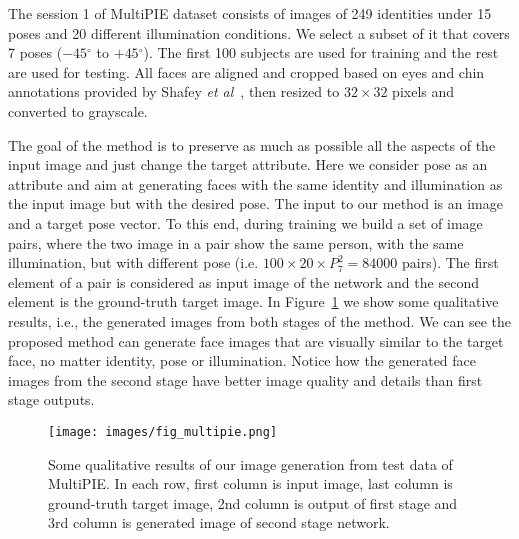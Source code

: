 \documentclass[10pt,twocolumn,letterpaper]{article}
\newcommand{\degree}{\ensuremath{{}^{\circ}}\xspace}
\def\etal{\emph{et al}\onedot}
\begin{document}
The session 1 of MultiPIE dataset consists of images of 249 identities under 15 poses and 20 different illumination conditions. We select a subset of it that covers 7 poses ($-45\degree$ to $+45\degree$). The first 100 subjects are used for training and the rest are used for testing. 
All faces are aligned and cropped based on eyes and chin annotations provided by Shafey \etal~\cite{Shafey-pami13}, then resized to $32\times32$ pixels and converted to grayscale.

The goal of the method is to preserve as much as possible all the aspects of the input image and just change the target attribute. Here we consider pose as an attribute and aim at generating faces with the same identity and illumination as the input image but with the desired pose. The input to our method is an image and a target pose vector. 
To this end, during training we build a set of image pairs, where the two image in a pair show the same person, with the same illumination, but with different pose (i.e. $100\times20\times P_{7}^{2}=84000$ pairs). The first element of a pair is considered as input image of the network and the second element is the ground-truth target image.
In Figure~\ref{fig:2stage_examples} we show some qualitative results, i.e., the generated images from both stages of the method. We can see the proposed method can generate face images that are visually similar to the target face, no matter identity, pose or illumination.
Notice how the generated face images from the second stage have better image quality and details than first stage outputs.

\begin{figure}[t]
\begin{center}
   \texttt{[image: images/fig\_multipie.png]}
\end{center}
\caption{Some qualitative results of our image generation from test data of MultiPIE. In each row, first column is input image, last column is ground-truth target image, 2nd column is output of first stage and 3rd column is generated image of second stage network.}
\label{fig:2stage_examples}
\end{figure}
\end{document}
